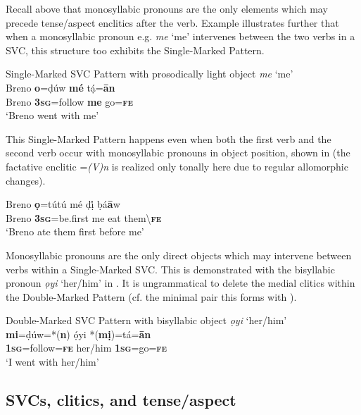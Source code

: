 \documentclass[output=paper]{langsci/langscibook}
\begin{document}
Recall above that monosyllabic pronouns are the only elements which may precede tense/aspect enclitics after the verb. Example  illustrates further that when a monosyllabic pronoun e.g. \textit{me} ‘me’ intervenes between the two verbs in a SVC, this structure too exhibits the Single-Marked Pattern. 

\ea\label{ex:rolle:11}
{Single-Marked SVC Pattern with prosodically light object \textit{me} ‘me’}\\
\gll  Breno  \textbf{o}=ḍúw    \textbf{mé}  tạ́=\textbf{ān}\\
     Breno   \textbf{3}\textbf{\textsc{sg}}=follow   \textbf{me}  go=\textbf{\textsc{fe}}\\
\glt ‘Breno went with me’ \citep[115]{Kari2004}
\z


This Single-Marked Pattern happens even when both the first verb and the second verb occur with monosyllabic pronouns in object position, shown in  (the factative enclitic =\textit{(V)n} is realized only tonally here due to regular allomorphic changes).

\ea\label{ex:rolle:12}
\gll  Breno   \textbf{ọ}=tútú     mé   ḍị́   ḅá\textbf{ā}w\\
     Breno  \textbf{\textsc{3sg}}=be.first  me  eat  them{\textbackslash}\textbf{\textsc{fe}}\\
\glt ‘Breno ate them first before me’
\z

Monosyllabic pronouns are the only direct objects which may intervene between verbs within a Single-Marked SVC. This is demonstrated with the bisyllabic pronoun \textit{ọyi} ‘her/him’ in . It is ungrammatical to delete the medial clitics within the Double-Marked Pattern (cf. the minimal pair this forms with ). 

\ea\label{ex:rolle:13}
{Double-Marked SVC Pattern with bisyllabic object \textit{ọyi} ‘her/him’}\\
\gll  \textbf{mi}=ḍúw=*(\textbf{n})     ọ́yi     *(\textbf{mị})=tá=\textbf{ān}\\
     \textbf{1\textsc{sg}}=follow=\textbf{\textsc{fe}}   her/him   \textbf{1\textsc{sg}}=go=\textbf{\textsc{fe}}\\
\glt ‘I went with her/him’ \citep[201]{Kari2004}
\z

\subsection{SVCs, clitics, and tense/aspect}
\end{document}

